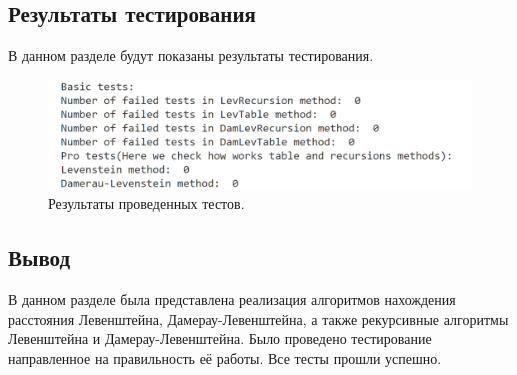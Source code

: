 \documentclass[a4paper, 12pt]{article}
\begin{document}
\begin{flushleft}
	\subsection{Результаты тестирования}
	\hspace*{5mm} В данном разделе будут показаны результаты тестирования.
	\begin{figure}[h]
		\centering \includegraphics[scale=0.8]{result_tests}
		\centering\caption{Результаты проведенных тестов.}
	\end{figure}
	\subsection{Вывод}
	\hspace*{5mm} В данном разделе была представлена реализация алгоритмов нахождения расстояния Левенштейна, Дамерау-Левенштейна, а также рекурсивные алгоритмы Левенштейна и Дамерау-Левенштейна. Было проведено тестирование направленное на правильность её работы. Все тесты прошли успешно. 
	
\end{flushleft}

\newpage
\end{document}
